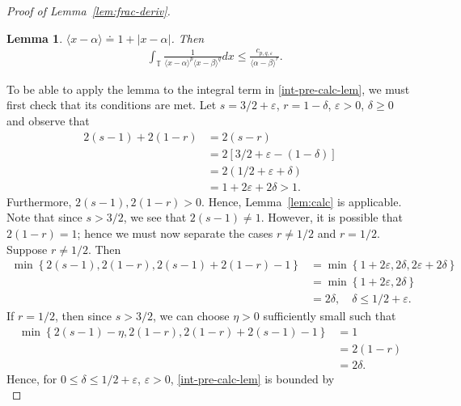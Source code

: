 \documentclass[12pt,reqno]{amsart}
\numberwithin{equation}{section}  %
\numberwithin{figure}{section}
\newcommand{\ci}{\mathbb{T}}
\newcommand{\ee}{\varepsilon}
\newtheorem{lemma}[theorem]{Lemma}
\begin{document}
\begin{proof}[Proof of Lemma~\ref{lem:frac-deriv}]
\begin{lemma}
 $\langle x - \alpha \rangle  \doteq 1 + | x - \alpha |$. Then 
  \begin{equation*}
\begin{split}
  & \int_{\ci} \frac{1}{\langle x - \alpha \rangle ^{p} \langle x -
  \beta \rangle
  ^{q}} d x
  \le \frac{c_{p,q, \ee}}{\langle \alpha - \beta \rangle ^{r}}. 
  \end{split}
\end{equation*}
\end{lemma}
To be able to apply the lemma to the integral term in \eqref{int-pre-calc-lem}, 
we must first check
that its conditions are met. Let $ s = 3/2 + \ee$, $r = 1- \delta$, $\ee > 0$, $
\delta \ge 0$ and observe that
%
%
\begin{equation*}
\begin{split}
2(s-1) + 2(1-r)
& = 2(s-r)
\\
& = 2[3/2 + \ee - (1 - \delta)]
\\
& = 2(1/2 + \ee + \delta)
\\
& = 1 + 2 \ee + 2 \delta > 1.
\end{split}
\end{equation*}
%
%
Furthermore, $2(s-1), 2(1-r) > 0$. Hence, Lemma~\ref{lem:calc} is applicable. 
Note that since $s > 3/2$, we see that $2(s-1) \neq 1$. However, it is possible that $2(1-r) =1$; hence we must now separate the cases $r \neq 1/2$ and $r = 1/2$. Suppose $r \neq 1/2$. Then 
%
%
\begin{equation*}
\begin{split}
  \min\left\{ 2(s-1), 2(1-r), 2(s-1) + 2(1-r) -1 \right\}
  & = \min\left\{ 1 + 2 \ee, 2 \delta, 2\ee + 2 \delta \right\}
  \\
  & = \min\left\{ 1 + 2 \ee, 2 \delta\right\}
  \\
  & = 2 \delta, \quad \delta \le 1/2 + \ee.
\end{split}
\end{equation*}
%
If $r = 1/2$, then since $s > 3/2$, we can choose $\eta > 0$ sufficiently small
such that
%
%
\begin{equation*}
\begin{split}
  \min\left\{ 2(s-1) -\eta , 2(1-r), 2(1-r) + 2(s-1) - 1  \right\}
  & = 1 
  \\
  & = 2(1 -r)
  \\
  & = 2\delta.
\end{split}
\end{equation*}
%
Hence, for $0 \le \delta \le 1/2 + \ee$, $\ee >
0$, \eqref{int-pre-calc-lem} is bounded by
\begin{equation*}

\end{equation*}
\end{proof}
\end{document}
